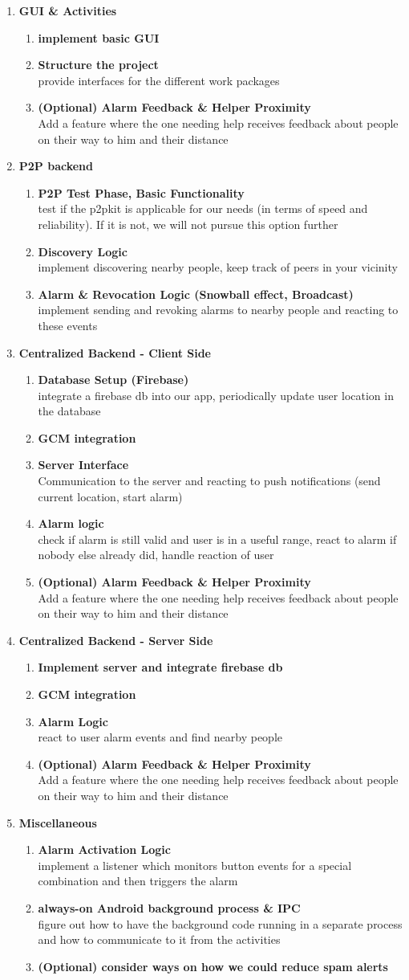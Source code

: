 \documentclass{report}
\begin{document}
\newcommand{\wpitem}[2]{\item\textbf{#1}\\#2}
\newcommand{\wpgroup}[2]{
    \item\textbf{#1}
    \begin{enumerate}[label*=\arabic*.]
        #2
    \end{enumerate}
}
\begin{enumerate}[label*=\arabic*.]
    \wpgroup{GUI \& Activities}{
        \wpitem{implement basic GUI}{}
        \wpitem{Structure the project}{provide interfaces for the different work packages}
        \wpitem{(Optional) Alarm Feedback \& Helper Proximity}{Add a feature where the one needing help receives feedback about people on their way to him and their distance}
    }
    \wpgroup{P2P backend}{
        \wpitem{P2P Test Phase, Basic Functionality}{
            test if the p2pkit is applicable for our needs (in terms of speed and reliability).
            If it is not, we will not pursue this option further
        }
        \wpitem{Discovery Logic}{implement discovering nearby people, keep track of peers in your vicinity}
        \wpitem{Alarm \& Revocation Logic (Snowball effect, Broadcast)}{implement sending and revoking alarms to nearby people and reacting to these events}
    }
    \wpgroup{Centralized Backend - Client Side}{
        \wpitem{Database Setup (Firebase)}{integrate a firebase db into our app, periodically update user location in the database}
        \wpitem{GCM integration}{}
        \wpitem{Server Interface}{Communication to the server and reacting to push notifications (send current location, start alarm)}
        \wpitem{Alarm logic}{check if alarm is still valid and user is in a useful range, react to alarm if nobody else already did, handle reaction of user}
        \wpitem{(Optional) Alarm Feedback \& Helper Proximity}{Add a feature where the one needing help receives feedback about people on their way to him and their distance}
    }
    \wpgroup{Centralized Backend - Server Side}{
        \wpitem{Implement server and integrate firebase db}{}
        \wpitem{GCM integration}{}
        \wpitem{Alarm Logic}{react to user alarm events and find nearby people}
        \wpitem{(Optional) Alarm Feedback \& Helper Proximity}{Add a feature where the one needing help receives feedback about people on their way to him and their distance}
    }
    \wpgroup{Miscellaneous}{
        \wpitem{Alarm Activation Logic}{implement a listener which monitors button events for a special combination and then triggers the alarm}
        \wpitem{always-on Android background process \& IPC}{figure out how to have the background code running in a separate process and how to communicate to it from the activities}
        \wpitem{(Optional) consider ways on how we could reduce spam alerts}{}
    }

\end{enumerate}
 
\end{document}
